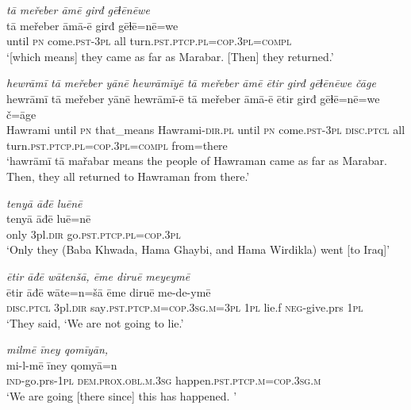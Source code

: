 \ea \label{BP.114}
\textit{tā meřeber āmē girđ gēɫēnēwe} \\ 
\gll tā meřeber āmā-ē girđ gēɫē=nē=we \\ 
 until \textsc{pn} come\textsc{.pst}\textsc{-3pl} all turn\textsc{.pst}\textsc{.ptcp}\textsc{.pl}\textsc{=cop}\textsc{.3pl}\textsc{=compl} \\ 
\glt `[which means] they came as far as Marabar. [Then] they returned.'
\z 
 
\ea \label{BP.115}
\textit{hewrāmī tā meřeber yānē hewrāmīyē tā meřeber āmē ētir girđ gēɫēnēwe čāge} \\ 
\gll hewrāmī tā meřeber yānē hewrāmī-ē tā meřeber āmā-ē ētir girđ gēɫē=nē=we č=āge \\ 
 Hawrami until \textsc{pn} that\_means Hawrami\textsc{-dir}\textsc{.pl} until \textsc{pn} come\textsc{.pst}\textsc{-3pl} \textsc{disc.ptcl} all turn\textsc{.pst}\textsc{.ptcp}\textsc{.pl}\textsc{=cop}\textsc{.3pl}\textsc{=compl} from=there \\ 
\glt `hawrāmī tā mařabar means the people of Hawraman came as far as Marabar. Then, they all returned to Hawraman from there.'
\z 
 
\ea \label{BP.116}
\textit{tenyā āđē luēnē} \\ 
\gll tenyā āđē luē=nē \\ 
 only 3pl\textsc{.dir} go\textsc{.pst}\textsc{.ptcp}\textsc{.pl}\textsc{=cop}\textsc{.3pl} \\ 
\glt `Only they (Baba Khwada, Hama Ghaybi, and Hama Wirdikla) went [to Iraq]'
\z 
 
\ea \label{BP.117}
\textit{ētir āđē wātenšā, ēme diruē meyeymē} \\ 
\gll ētir āđē wāte=n=šā ēme diruē me-de-ymē \\ 
 \textsc{disc.ptcl} 3pl\textsc{.dir} say\textsc{.pst}\textsc{.ptcp}\textsc{.m}\textsc{=cop}\textsc{.3sg}\textsc{.m}\textsc{=3pl} \textsc{1pl} lie.f \textsc{neg-}give.prs \textsc{1pl} \\ 
\glt `They said, ‘We are not going to lie.'
\z 
 
\ea \label{BP.119}
\textit{milmē īney qomīyān,} \\ 
\gll mi-l-mē īney qomyā=n \\ 
 \textsc{ind-}go.prs\textsc{-\textsc{1pl}} \textsc{dem.prox}\textsc{.obl}\textsc{.m}\textsc{.3sg} happen\textsc{.pst}\textsc{.ptcp}\textsc{.m}\textsc{=cop}\textsc{.3sg}\textsc{.m} \\ 
\glt `We are going [there since] this has happened. '
\z 
 
